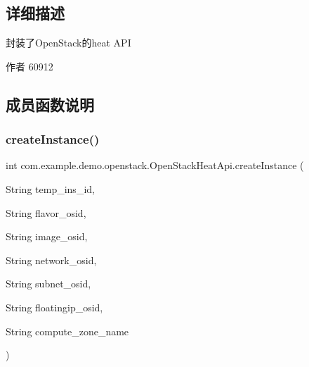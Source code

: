 \subsection{详细描述}
封装了\+Open\+Stack的heat A\+PI 

\begin{DoxyAuthor}{作者}
60912 
\end{DoxyAuthor}


\subsection{成员函数说明}
\mbox{\label{classcom_1_1example_1_1demo_1_1openstack_1_1_open_stack_heat_api_afd9025ea425d8a2f0a4104f815412ff5}} 
\subsubsection{\texorpdfstring{create\+Instance()}{createInstance()}}
{\footnotesize\ttfamily int com.\+example.\+demo.\+openstack.\+Open\+Stack\+Heat\+Api.\+create\+Instance (\begin{DoxyParamCaption}\item[{String}]{temp\+\_\+ins\+\_\+id,  }\item[{String}]{flavor\+\_\+osid,  }\item[{String}]{image\+\_\+osid,  }\item[{String}]{network\+\_\+osid,  }\item[{String}]{subnet\+\_\+osid,  }\item[{String}]{floatingip\+\_\+osid,  }\item[{String}]{compute\+\_\+zone\+\_\+name }\end{DoxyParamCaption})}

